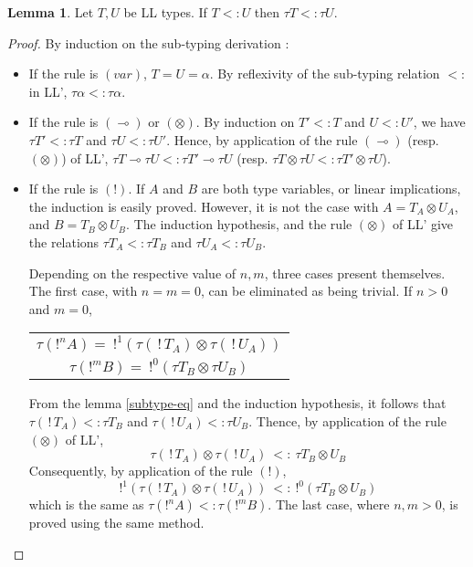 \documentclass[9pt]{article}
\theoremstyle{plain}
\theoremstyle{definition}
\newtheorem{lemma}{Lemma}[section]
\def\bang{\,!\,}
\begin{document}
\begin{lemma}
	\label{subLL=>subLL'}
	Let $T, U$ be LL types. If $T <: U$ then $\tau T <: \tau U$.

	\begin{proof}
		By induction on the sub-typing derivation :
		\begin{itemize}
			\item If the rule is $(var)$, $T = U = \alpha$. By reflexivity of the sub-typing relation $<:$ in LL', $\tau \alpha <: \tau \alpha$.
			
			\item If the rule is $(\multimap)$ or $(\otimes)$. By induction on $T' <: T$ and $U <: U'$, we have $\tau T' <: \tau T$ and
				$\tau U <: \tau U'$. Hence, by application of the rule $(\multimap)$ (resp. $(\otimes)$) of LL',
				$\tau T \multimap \tau U <: \tau T' \multimap \tau U$ (resp. $\tau T \otimes \tau U <: \tau T' \otimes \tau U$).			
				
			\item If the rule is $(!)$. If $A$ and $B$ are both type variables, or linear implications, the induction is easily proved.
				However, it is not the case with $A = T_A \otimes U_A$, and $B = T_B \otimes U_B$.
				The induction hypothesis, and the rule $(\otimes)$ of LL' give the relations $\tau T_A <: \tau T_B$ and $\tau U_A <: \tau U_B$.
				
				Depending on the respective value of $n, m$, three cases present themselves.
				The first case, with $n = m = 0$, can be eliminated as being trivial.
				If $n > 0$ and $m = 0$,
					\begin{center}
					\begin{tabular}{c}
					$\tau (!^n A) = ~ !^1 (\tau (\bang T_A) \otimes \tau (\bang U_A))$ \\
					$\tau (!^m B) = ~ !^0 (\tau T_B \otimes \tau U_B)$					
					\end{tabular}
					\end{center}
				From the lemma \ref{subtype-eq} and the induction hypothesis, it follows that $\tau (\bang T_A) <: \tau T_B$ and
				$\tau (\bang U_A) <: \tau U_B$. Thence, by application of the rule $(\otimes)$ of LL',
					$$ \tau (\bang T_A) \otimes \tau (\bang U_A) ~ <: ~ \tau T_B \otimes U_B$$
				Consequently, by application of the rule $(!)$,
					$$ !^1 (\tau (\bang T_A) \otimes \tau (\bang U_A)) ~ <: ~ !^0 (\tau T_B \otimes U_B)$$
				which is the same as $\tau (!^nA) <: \tau (!^mB)$.
				The last case, where $n, m > 0$, is proved using the same method.

		\end{itemize}
	\end{proof}
\end{lemma}
	
\end{document}
